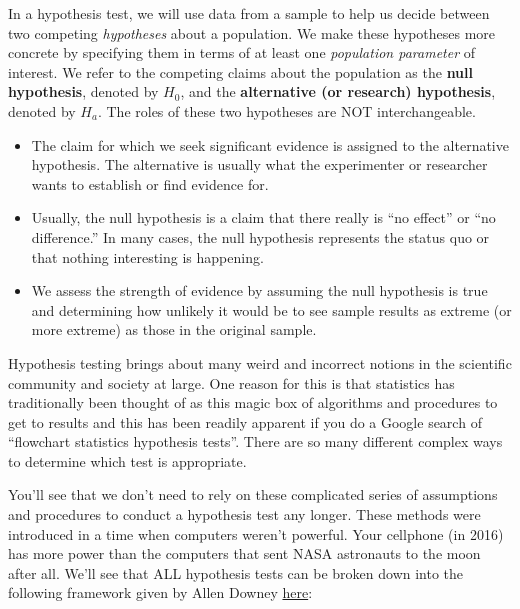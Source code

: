 \documentclass[]{tufte-book}
\providecommand{\tightlist}{%
  \setlength{\itemsep}{0pt}\setlength{\parskip}{0pt}}
\begin{document}
In a hypothesis test, we will use data from a sample to help us decide
between two competing \emph{hypotheses} about a population. We make
these hypotheses more concrete by specifying them in terms of at least
one \emph{population parameter} of interest. We refer to the competing
claims about the population as the \textbf{null hypothesis}, denoted by
\(H_0\), and the \textbf{alternative (or research) hypothesis}, denoted
by \(H_a\). The roles of these two hypotheses are NOT interchangeable.

\begin{itemize}
\tightlist
\item
  The claim for which we seek significant evidence is assigned to the
  alternative hypothesis. The alternative is usually what the
  experimenter or researcher wants to establish or find evidence for.
\item
  Usually, the null hypothesis is a claim that there really is ``no
  effect'' or ``no difference.'' In many cases, the null hypothesis
  represents the status quo or that nothing interesting is happening.\\
\item
  We assess the strength of evidence by assuming the null hypothesis is
  true and determining how unlikely it would be to see sample results as
  extreme (or more extreme) as those in the original sample.
\end{itemize}

Hypothesis testing brings about many weird and incorrect notions in the
scientific community and society at large. One reason for this is that
statistics has traditionally been thought of as this magic box of
algorithms and procedures to get to results and this has been readily
apparent if you do a Google search of ``flowchart statistics hypothesis
tests''. There are so many different complex ways to determine which
test is appropriate.

You'll see that we don't need to rely on these complicated series of
assumptions and procedures to conduct a hypothesis test any longer.
These methods were introduced in a time when computers weren't powerful.
Your cellphone (in 2016) has more power than the computers that sent
NASA astronauts to the moon after all. We'll see that ALL hypothesis
tests can be broken down into the following framework given by Allen
Downey
\href{http://allendowney.blogspot.com/2016/06/there-is-still-only-one-test.html}{here}:
\end{document}
